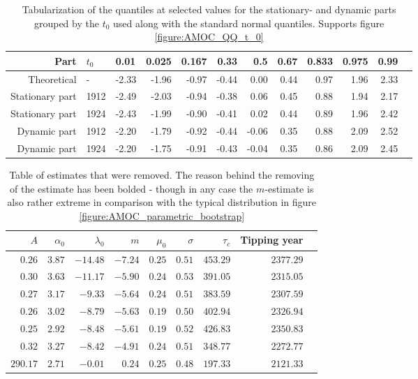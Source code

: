     \begin{table}[h!]
        \centering
        \begin{tabular}{rllrrrrrrrrr}
          \hline
         Part & $t_0$ & 0.01 & 0.025 & 0.167 & 0.33 & 0.5 & 0.67 & 0.833 & 0.975 & 0.99 \\ 
          \hline
        Theoretical & - & -2.33 & -1.96 & -0.97 & -0.44 & 0.00 & 0.44 & 0.97 & 1.96 & 2.33 \\ 
        Stationary part & 1912 & -2.49 & -2.03 & -0.94 & -0.38 & 0.06 & 0.45 & 0.88 & 1.94 & 2.17 \\ 
        Stationary part & 1924 & -2.43 & -1.99 & -0.90 & -0.41 & 0.02 & 0.44 & 0.89 & 1.96 & 2.42 \\ 
        Dynamic part & 1912 & -2.20 & -1.79 & -0.92 & -0.44 & -0.06 & 0.35 & 0.88 & 2.09 & 2.52 \\ 
        Dynamic part & 1924 & -2.20 & -1.75 & -0.91 & -0.43 & -0.04 & 0.35 & 0.86 & 2.09 & 2.45 \\ 
           \hline
        \end{tabular}
        \caption{Tabularization of the quantiles at selected values for the stationary- and dynamic parts grouped by the $t_0$ used along with the standard normal quantiles. Supports figure \ref{figure:AMOC_QQ_t_0}}
        \label{table:QQ_table_parts}
        \end{table}
    
    \begin{table}[ht]
        \centering
        \begin{tabular}{rrrrrrrrr}
            \hline
            $A$ & $\alpha_0$ & $\lambda_0$ & $m$ & $\mu_0$ & $\sigma$ & $\tau_c$ & Tipping year \\ 
            \hline
            $0.26$ & $3.87$ & $-14.48$ & $-7.24$ & $0.25$ & $0.51$ & $453.29$ & $2377.29$ \\ 
            $0.30$ & $3.63$ & $-11.17$ & $-5.90$ & $0.24$ & $0.53$ & $391.05$ & $2315.05$ \\ 
            $0.27$ & $3.17$ & $-9.33$ & $-5.64$ & $0.24$ & $0.51$ & $383.59$ & $2307.59$ \\ 
            $0.26$ & $3.02$ & $-8.79$ & $-5.63$ & $0.19$ & $0.50$ & $402.94$ & $2326.94$ \\ 
            $0.25$ & $2.92$ & $-8.48$ & $-5.61$ & $0.19$ & $0.52$ & $426.83$ & $2350.83$ \\ 
            $0.32$ & $3.27$ & $-8.42$ & $-4.91$ & $0.24$ & $0.51$ & $348.77$ & $2272.77$ \\ 
            $290.17$ & $2.71$ & $-0.01$ & $0.24$& $0.25$ & $0.48$ & $197.33$ & $2121.33$ \\ 
             \hline
        \end{tabular}
        \caption{Table of estimates that were removed. The reason behind the removing of the estimate has been bolded - though in any case the $m$-estimate is also rather extreme in comparison with the typical distribution in figure \ref{figure:AMOC_parametric_bootstrap}}
        \label{table:extreme_amoc_estimates}
        \end{table}